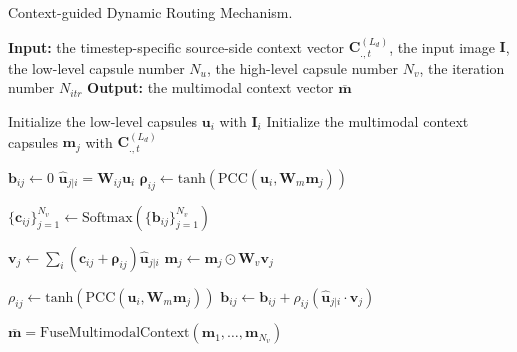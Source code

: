 \documentclass[sigconf]{acmart}
\begin{document}
\begin{spacing}{0.8}
\begin{algorithm}[t!]
\caption{Context-guided Dynamic Routing Mechanism.} \label{routing}
\begin{algorithmic}[1]
\State \textbf{Input:} 
the timestep-specific source-side context vector $\mathbf{C}_{.,t}^{(L_d)}$, 
the input image $\mathbf{I}$, 
the low-level capsule number $N_u$,
the high-level capsule number $N_v$, 
the iteration number $N_{itr}$
\State \textbf{Output:} the multimodal context vector $\mathbf{\overline{m}}$

\State Initialize the low-level capsules $\mathbf{u}_i$ with $\mathbf{I}_i$ \label{line_ui}
\EndFor
{}
\State Initialize the multimodal context capsules $\mathbf{m}_j$ with $\mathbf{C}_{.,t}^{(L_d)}$ \label{line_cs}
\EndFor

\State $\mathbf{b}_{ij} \gets 0$
\State $\mathbf{\hat{u}}_{j|i} = \mathbf{W}_{ij}\mathbf{u}_i$ \label{line_uhij}
\State $\mathbf{\rho}_{ij} \gets \mathrm{tanh}(\mathrm{PCC}(\mathbf{u}_i, \mathbf{W}_m\mathbf{m}_j))$  \label{line_pij}
\EndFor
\EndFor

 \label{line_begin}

\State $\{\mathbf{c}_{ij}\}_{j=1}^{N_v} \gets \mathrm{Softmax}(\{\mathbf{b}_{ij}\}_{j=1}^{N_v})$ \label{line_ci}
\EndFor
\EndFor

\State $\mathbf{v}_j \gets \sum_i (\mathbf{c}_{ij}+\mathbf{\rho}_{ij}){\mathbf{\hat u}}_{j|i}$ \label{line_vj}
\State $\mathbf{m}_j \gets \mathbf{m}_j \odot \mathbf{W}_v\mathbf{v}_j$ \label{line_mj}
\EndFor


\State $\rho_{ij} \gets \mathrm{tanh}(\mathrm{PCC}(\mathbf{u}_i, \mathbf{W}_m\mathbf{m}_j))$   \label{line_pij2}
\State $\mathbf{b}_{ij} \gets \mathbf{b}_{ij} + \rho_{ij}(\mathbf{\hat{u}}_{j|i} \cdot \mathbf{v}_j)$ \label{line_bij} 
\EndFor
\EndFor

\EndFor \label{line_end}
\State $\mathbf{\overline{m}}=\mathrm{FuseMultimodalContext}(\mathbf{m}_1,\dots,\mathbf{m}_{N_v})$ \label{line_cm}
\end{algorithmic}
\end{algorithm}
\end{spacing}
\end{document}
